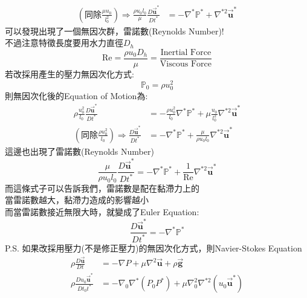 \documentclass[../main.tex]{subfiles}
\begin{document}
\begin{itemize}
\begin{itemize}
\begin{align}
      (\text{同除}\frac{\mu u_0}{l_0^2}) \Rightarrow
      \frac{\rho u_0 l_0}{\mu} \frac{D \vec {\bm u}^\ast}{D t^\ast} &= 
      - \nabla^\ast \mathbb P^\ast 
      + \nabla^{\ast 2} \vec {\bm u}^\ast
    \end{align}
    可以發現出現了一個無因次群，雷諾數(Reynolds Number)!\\
    不過注意特徵長度要用水力直徑$D_h$
    \begin{equation}
      \text{Re} = \frac{\rho u_0 D_h}{\mu} = \frac{\text{Inertial Force}}{\text{Viscous Force}}
    \end{equation}
    若改採用產生的壓力無因次化方式:
    \begin{equation}
      \mathbb P_0 = \rho u_0^2
    \end{equation}
    則無因次化後的Equation of Motion為:
    \begin{align}
      \rho \frac{u_0^2}{l_0} \frac{D \vec {\bm u}^\ast}{D t^\ast} &= 
      -\frac{\rho u_0^2}{l_0} \nabla^\ast \mathbb P^\ast 
      + \mu \frac{u_0}{l_0^2} \nabla^{\ast 2} \vec {\bm u}^\ast \nonumber\\
      (\text{同除}\frac{\rho u_0^2}{l_0}) \Rightarrow
      \frac{D \vec {\bm u}^\ast}{D t^\ast} &= 
      - \nabla^\ast \mathbb P^\ast 
      + \frac{\mu}{\rho u_0 l_0} \nabla^{\ast 2} \vec {\bm u}^\ast
    \end{align}
    這邊也出現了雷諾數(Reynolds Number)
    \begin{equation}
      \frac{\mu}{\rho u_0 l_0} \frac{D \vec {\bm u}^\ast}{D t^\ast} = 
      - \nabla^\ast \mathbb P^\ast 
      + \frac{1}{\text{Re}} \nabla^{\ast 2} \vec {\bm u}^\ast
    \end{equation}
    而這條式子可以告訴我們，雷諾數是配在黏滯力上的\\
    當雷諾數越大，黏滯力造成的影響越小\\
    而當雷諾數接近無限大時，就變成了Euler Equation:
    \begin{equation}
      \frac{D \vec {\bm u}^\ast}{D t^\ast} = 
      - \nabla^\ast \mathbb P^\ast
    \end{equation}
    P.S. 如果改採用壓力(不是修正壓力)的無因次化方式，則Navier-Stokes Equation
    \begin{align}
      \rho \frac{D\vec {\bm u}}{Dt} &= -\nabla P + \mu \nabla^2 \vec {\bm u} + \rho \vec{\bm g} \nonumber\\
      \rho \frac{D u_0 \vec{ \bm u}^\ast}{D  t_0 t^\ast} &=
      -\nabla_0\nabla^\ast \left(P_0 P^\ast\right)
      + \mu \nabla_0^2 \nabla^{\ast 2} \left(u_0 \vec {\bm u}^\ast\right)

\end{align}
\end{itemize}
\end{itemize}
\end{document}
